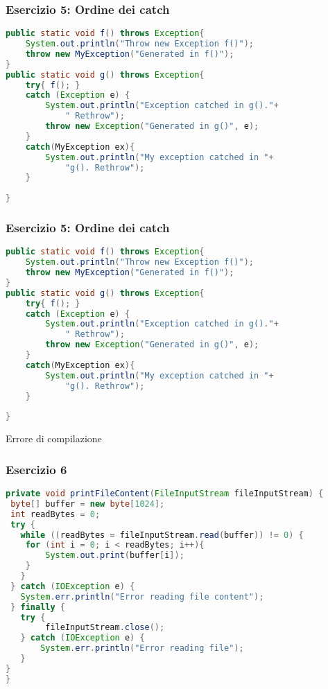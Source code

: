 \documentclass{beamer}
\begin{document}
\begin{frame}[fragile]
\frametitle{Esercizio 5: Ordine dei catch}
\begin{lstlisting}[language=Java]
public static void f() throws Exception{
    System.out.println("Throw new Exception f()");
    throw new MyException("Generated in f()");
}
public static void g() throws Exception{
    try{ f(); }
    catch (Exception e) {
        System.out.println("Exception catched in g()."+
            " Rethrow");
        throw new Exception("Generated in g()", e);
    }
    catch(MyException ex){
        System.out.println("My exception catched in "+
            "g(). Rethrow");
    }
    
}
\end{lstlisting}
\end{frame}

\begin{frame}[fragile]
\frametitle{Esercizio 5: Ordine dei catch}
\begin{lstlisting}[language=Java]
public static void f() throws Exception{
    System.out.println("Throw new Exception f()");
    throw new MyException("Generated in f()");
}
public static void g() throws Exception{
    try{ f(); }
    catch (Exception e) {
        System.out.println("Exception catched in g()."+
            " Rethrow");
        throw new Exception("Generated in g()", e);
    }
    catch(MyException ex){
        System.out.println("My exception catched in "+
            "g(). Rethrow");
    }
    
}
\end{lstlisting}
Errore di compilazione
\end{frame}


\begin{frame}[fragile]
\frametitle{Esercizio 6}
\begin{lstlisting}[language=Java]
private void printFileContent(FileInputStream fileInputStream) {
 byte[] buffer = new byte[1024];
 int readBytes = 0;
 try {
   while ((readBytes = fileInputStream.read(buffer)) != 0) {
    for (int i = 0; i < readBytes; i++){
        System.out.print(buffer[i]);
    }
   }
 } catch (IOException e) {
   System.err.println("Error reading file content");
 } finally {
   try {
        fileInputStream.close();
   } catch (IOException e) {
       System.err.println("Error reading file");
   }
} 
}
\end{lstlisting}
\end{frame}
\end{document}
